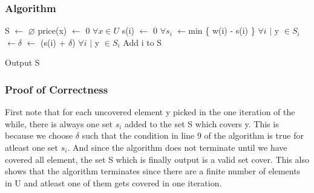 \documentclass[11pt]{article}
\newcommand*\Let[2]{\State #1 $\gets$ #2}
\begin{document}
\subsubsection{Algorithm}
\begin{algorithm}[H]
  \caption{}
  \begin{algorithmic}[1]
		\Let{S}{$\varnothing$} 
		\Let{price(x)}{0} $\forall x \in U$ 
		\Let{s(i)}{0} $\forall s_i$ 
		\State {$\delta$} $\gets${min \{ w(i) - s(i) \}} $\forall i$ $|$ y $\in {S_i}$
		$\gets${$\delta$}
		$\gets${ (s(i) + $\delta$)} $\forall i$ $|$ y $\in {S_i}$
		 Add i to S \EndIf
		\EndFor
			
		\EndWhile		
		Output S
  \end{algorithmic}
\end{algorithm}

\subsubsection{Proof of Correctness}

First note that for each uncovered element y picked in the one iteration of the while, there is always one set $s_i$ added to the set S which covers y. This is because we choose $\delta$ such that the condition in line 9 of the algorithm is true for atleast one set $s_i$. And since the algorithm does not terminate until we have covered all element, the set S which is finally output is a valid set cover. This also shows that the algorithm terminates since there are a finite number of elements in U and atleast one of them gets covered in one iteration.
\end{document}

